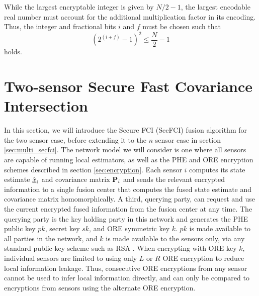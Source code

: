 \documentclass[letterpaper, 10 pt, conference]{ieeeconf}  %
\begin{document}
While the largest encryptable integer is given by $N/2-1$, the largest encodable real number must account for the additional multiplication factor in its encoding. Thus, the integer and fractional bits $i$ and $f$ must be chosen such that
\begin{equation}
   (2^{(i+f)}-1)^2 \leq \frac{N}{2}-1 \label{eqn:qmn_max}
\end{equation}
holds.





\section{Two-sensor Secure Fast Covariance Intersection} \label{sec:secfci}
In this section, we will introduce the Secure FCI (SecFCI) fusion algorithm for the two sensor case, before extending it to the $n$ sensor case in section \ref{sec:multi_secfci}. The network model we will consider is one where all sensors are capable of running local estimators, as well as the PHE and ORE encryption schemes described in section \ref{sec:encryption}. Each sensor $i$ computes its state estimate $\hat{{\underline{x}}}_i$ and covariance matrix ${{\mathbf{P}}}_i$ and sends the relevant encrypted information to a single fusion center that computes the fused state estimate and covariance matrix homomorphically. A third, querying party, can request and use the current encrypted fused information from the fusion center at any time. The querying party is the key holding party in this network and generates the PHE public key $pk$, secret key $sk$, and ORE symmetric key $k$. $pk$ is made available to all parties in the network, and $k$ is made available to the sensors only, via any standard public-key scheme such as RSA \cite{rivestMethodObtainingDigital1978}. When encrypting with ORE key $k$, individual sensors are limited to using only $L$ or $R$ ORE encryption to reduce local information leakage. Thus, consecutive ORE encryptions from any sensor cannot be used to infer local information directly, and can only be compared to encryptions from sensors using the alternate ORE encryption.
\end{document}
